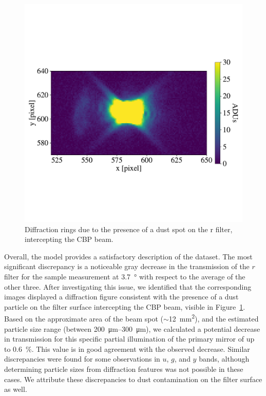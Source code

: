 \begin{figure}
  \centering
  \includegraphics[width=1\linewidth]{fig/diffraction_dust.pdf}
  \caption{Diffraction rings due to the presence of a dust spot on the
    r filter, intercepting the CBP beam.}
  \label{fig:dust}
\end{figure}


Overall, the model provides a satisfactory description of the
dataset. The most significant discrepancy is a noticeable gray
decrease in the transmission of the $r$ filter for the sample
measurement at \SI{3.7}{\degree} with respect to the average of the
other three.  After investigating this issue, we identified that the
corresponding images displayed a diffraction figure consistent with
the presence of a dust particle on the filter surface intercepting the
CBP beam, visible in Figure~\ref{fig:dust}. Based on the approximate area of the beam spot
($\sim$\SI{12}{\milli\metre\squared}), and the estimated particle size range (between
\SIrange{200}{300}{\micro\metre}), we calculated a potential decrease
in transmission for this specific partial illumination of the primary
mirror of up to \SI{0.6}{\percent}. This value is in good agreement
with the observed decrease. Similar discrepancies were found for some
observations in $u$, $g$, and $y$ bands, although determining particle
sizes from diffraction features was not possible in these cases. We
attribute these discrepancies to dust contamination on the filter
surface as well.

